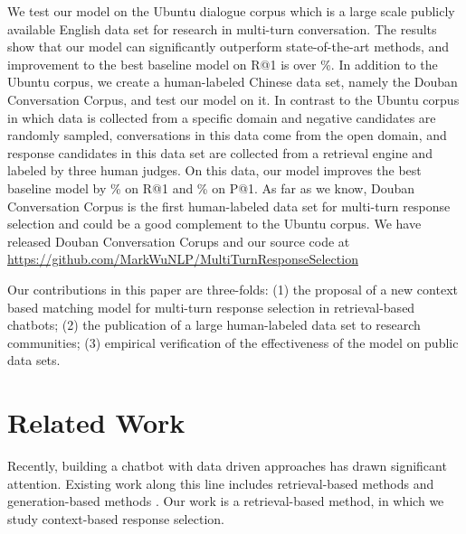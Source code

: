 \documentclass[11pt,a4paper]{article}
\begin{document}
	
	We test our model on the Ubuntu dialogue corpus \cite{lowe2015ubuntu} which is a large scale publicly available English data set for research in multi-turn conversation. The results show that our model can significantly outperform state-of-the-art methods, and  improvement to the best baseline model on R@1 is over \%. In addition to the Ubuntu corpus, we create a human-labeled Chinese data set, namely the Douban Conversation Corpus, and test our model on it. In contrast to the Ubuntu corpus in which data is collected from a specific domain and negative candidates are randomly sampled, conversations in this data come from the open domain, and response candidates in this data set are collected from a retrieval engine and labeled by three human judges. On this data, our model improves the best baseline model by \%  on R@1 and \% on P@1. As far as we know, Douban Conversation Corpus is the first human-labeled data set for multi-turn response selection and could be a good complement to the Ubuntu corpus. We have released Douban Conversation Corups and our source code at \url{https://github.com/MarkWuNLP/MultiTurnResponseSelection} 



	
	Our contributions in this paper are three-folds: (1) the proposal of a new context based matching model for multi-turn response selection in retrieval-based chatbots; (2) the publication of a large human-labeled data set to research communities; (3) empirical verification of the effectiveness of the model on public data sets.
	
	
	
	\section{Related Work}


	Recently, building a chatbot with data driven approaches \cite{ritter2011data,ji2014information} has drawn significant attention. Existing work along this line includes retrieval-based methods \cite{hu2014convolutional,ji2014information,wang2015syntax,DBLP:conf/sigir/YanSW16,DBLP:journals/corr/WuWLZ16,zhou2016multi,wu2016ranking} and generation-based methods \cite{DBLP:conf/acl/ShangLL15,serban2015building,vinyals2015neural,li2015diversity,li2016persona,xing2016topic,serban2016multiresolution}. Our work is a retrieval-based method, in which we study context-based response selection. 
	
\end{document}
